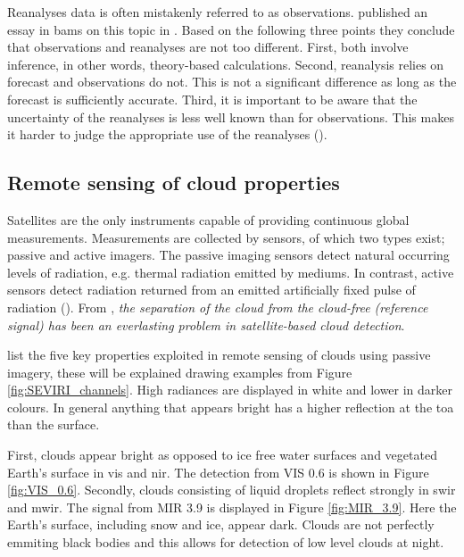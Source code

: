 Reanalyses data is often mistakenly referred to as observations. \citeauthor{Parker2016ReanalysesDifference} published an essay in \acrfull{bams} on this topic in \citeyear{Parker2016ReanalysesDifference}. Based on the following three points they conclude that observations and reanalyses are not too different. First, both involve inference, in other words, theory-based calculations. Second, reanalysis relies on forecast and observations do not. This is not a significant difference as long as the forecast is sufficiently accurate. Third, it is important to be aware that the uncertainty of the reanalyses is less well known than for observations. This makes it harder to judge the appropriate use of the reanalyses (\cite{Parker2016ReanalysesDifference}). 

\subsection{Remote sensing of cloud properties}
Satellites are the only instruments capable of providing continuous global measurements.
Measurements are collected by sensors, of which two types exist; passive and active imagers. The passive imaging sensors detect natural occurring levels of radiation, e.g. thermal radiation emitted by mediums. In contrast, active sensors  detect radiation returned from an emitted artificially fixed pulse of radiation (\cite{Stephens2018CloudsatSystem}). From \cite{Stockli2019CloudApplications}, \textit{the separation of the cloud from the cloud-free (reference signal) has been an everlasting problem in satellite-based cloud detection}.


 list the five key properties exploited in remote sensing of clouds using passive imagery, these will be explained drawing examples from Figure \ref{fig:SEVIRI_channels}. High radiances are displayed in white and lower in darker colours. In general anything that appears bright has a higher reflection at the \acrshort{toa} than the surface. 

First, clouds appear bright as opposed to ice free water surfaces and vegetated Earth's surface in \acrshort{vis} and \acrshort{nir}. The detection from VIS 0.6 is shown in Figure \ref{fig:VIS_0.6}. Secondly, clouds consisting of liquid droplets reflect strongly in \acrfull{swir} and \acrfull{mwir}. The signal from MIR 3.9 is displayed in Figure \ref{fig:MIR_3.9}. Here the Earth's surface, including snow and ice, appear dark. Clouds are not perfectly emmiting black bodies and this allows for detection of low level clouds at night.

